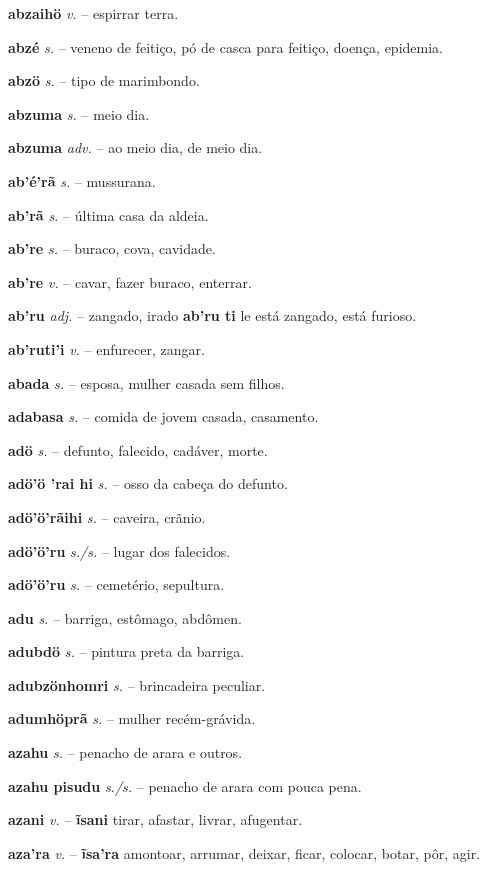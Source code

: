 \textbf{abzaihö} \textit{v.} -- espirrar terra.

\textbf{abzé} \textit{s.} -- veneno de feitiço, pó de casca para feitiço, doença, epidemia.

\textbf{abzö} \textit{s.} -- tipo de marimbondo.

\textbf{abzuma} \textit{s.} -- meio dia.

\textbf{abzuma} \textit{adv.} -- ao meio dia, de meio dia.

\textbf{ab'é'rã} \textit{s.} -- mussurana.

\textbf{ab'rã} \textit{s.} -- última casa da aldeia.

\textbf{ab're} \textit{s.} -- buraco, cova, cavidade.

\textbf{ab're} \textit{v.} -- cavar, fazer buraco, enterrar.

\textbf{ab'ru} \textit{adj.} -- zangado, irado \textbf{ab'ru ti} le está zangado, está furioso.

\textbf{ab'ruti'i} \textit{v.} -- enfurecer, zangar.

\textbf{abada} \textit{s.} -- esposa, mulher casada sem filhos.

\textbf{adabasa} \textit{s.} -- comida de jovem casada, casamento.

\textbf{adö} \textit{s.} -- defunto, falecido, cadáver, morte.

\textbf{adö'ö 'rai hi} \textit{s.} -- osso da cabeça do defunto.

\textbf{adö'ö'rãihi} \textit{s.} -- caveira, crãnio.

\textbf{adö'ö'ru} \textit{s./s.} -- lugar dos falecidos.

\textbf{adö'ö'ru} \textit{s.} -- cemetério, sepultura.

\textbf{adu} \textit{s.} -- barriga, estômago, abdômen.

\textbf{adubdö} \textit{s.} -- pintura preta da barriga.

\textbf{adubzönhomri} \textit{s.} -- brincadeira peculiar.

\textbf{adumhöprã} \textit{s.} -- mulher recém-grávida.

\textbf{azahu} \textit{s.} -- penacho de arara e outros.

\textbf{azahu pisudu} \textit{s./s.} -- penacho de arara com pouca pena.

\textbf{azani} \textit{v.} -- \textbf{ĩsani} tirar, afastar, livrar, afugentar.

\textbf{aza'ra} \textit{v.} -- \textbf{ĩsa'ra} amontoar, arrumar, deixar, ficar, colocar, botar, pôr, agir.

